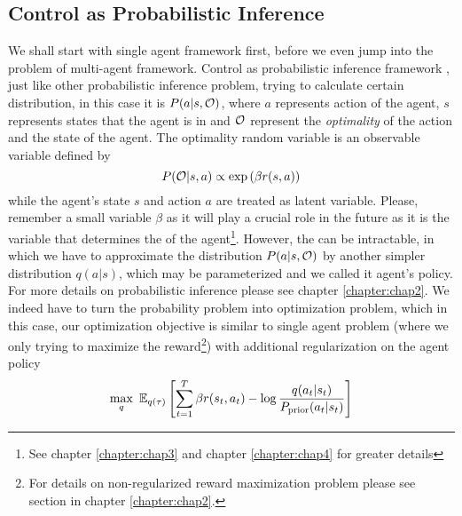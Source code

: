 \subsection{Control as Probabilistic Inference}
\label{sec:chap1-MERL-intro}
We shall start with single agent framework first, before we even jump into the problem of multi-agent framework. Control as probabilistic inference framework \cite{levine2018reinforcement}, just like other probabilistic inference problem, trying to calculate certain distribution, in this case it is $P(a | s, \mathcal{O})$, where $a$ represents action of the agent, $s$ represents states that the agent is in and $\mathcal{O}$ represent the \textit{optimality} of the action and the state of the agent. The optimality random variable is an observable variable defined by 
\begin{equation}
    P(\mathcal{O} | s, a) \propto \exp\left( \beta r(s, a) \right)
\end{equation}
while the agent's state $s$ and action $a$ are treated as latent variable. Please, remember a small variable $\beta$ as it will play a crucial role in the future as it is the variable that determines the  of the agent\footnote{See chapter \ref{chapter:chap3} and chapter \ref{chapter:chap4} for greater details}. However, the   can be intractable, in which we have to approximate the distribution $P(a | s, \mathcal{O})$ by another simpler distribution $q(a | s)$, which may be parameterized and we called it agent's policy. For more details on probabilistic inference please see chapter \ref{chapter:chap2}. We indeed have to turn the probability problem into optimization problem, which in this case, our optimization objective is similar to single agent problem (where we only trying to maximize the reward\footnote{For details on non-regularized reward maximization problem please see section in chapter \ref{chapter:chap2}.}) with additional regularization on the agent policy
\begin{equation}
\label{eqn:chap1-optim-objective}
    \max_q \ \mathbb{E}_{q(\tau)}\left[ \sum^T_{t=1} \beta r(s_t, a_t) - \log\frac{q(a_t | s_t)}{P_{\text{prior}}(a_t | s_t)}  \right]
\end{equation}
